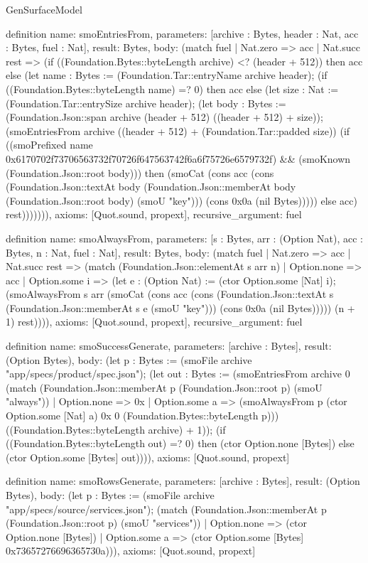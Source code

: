 \begin{lexlean}{GenSurfaceModel}
\begin{semanticmodule}
definition{
  name: smoEntriesFrom,
  parameters: [archive : Bytes, header : Nat, acc : Bytes, fuel : Nat],
  result: Bytes,
  body: (match fuel
    | Nat.zero => acc
    | Nat.succ rest => (if ((Foundation.Bytes::byteLength archive) <? (header + 512)) then acc else (let name : Bytes := (Foundation.Tar::entryName archive header); (if ((Foundation.Bytes::byteLength name) =? 0) then acc else (let size : Nat := (Foundation.Tar::entrySize archive header); (let body : Bytes := (Foundation.Json::span archive (header + 512) ((header + 512) + size)); (smoEntriesFrom archive ((header + 512) + (Foundation.Tar::padded size)) (if ((smoPrefixed name 0x6170702f73706563732f70726f647563742f6a6f75726e6579732f) && (smoKnown (Foundation.Json::root body))) then (smoCat (cons acc (cons (Foundation.Json::textAt body (Foundation.Json::memberAt body (Foundation.Json::root body) (smoU "key"))) (cons 0x0a (nil Bytes))))) else acc) rest))))))),
  axioms: [Quot.sound, propext],
  recursive_argument: fuel
}

definition{
  name: smoAlwaysFrom,
  parameters: [s : Bytes, arr : (Option Nat), acc : Bytes, n : Nat, fuel : Nat],
  result: Bytes,
  body: (match fuel
    | Nat.zero => acc
    | Nat.succ rest => (match (Foundation.Json::elementAt s arr n)
      | Option.none => acc
      | Option.some i => (let e : (Option Nat) := (ctor Option.some [Nat] i); (smoAlwaysFrom s arr (smoCat (cons acc (cons (Foundation.Json::textAt s (Foundation.Json::memberAt s e (smoU "key"))) (cons 0x0a (nil Bytes))))) (n + 1) rest)))),
  axioms: [Quot.sound, propext],
  recursive_argument: fuel
}

definition{
  name: smoSuccessGenerate,
  parameters: [archive : Bytes],
  result: (Option Bytes),
  body: (let p : Bytes := (smoFile archive "app/specs/product/spec.json"); (let out : Bytes := (smoEntriesFrom archive 0 (match (Foundation.Json::memberAt p (Foundation.Json::root p) (smoU "always"))
    | Option.none => 0x
    | Option.some a => (smoAlwaysFrom p (ctor Option.some [Nat] a) 0x 0 (Foundation.Bytes::byteLength p))) ((Foundation.Bytes::byteLength archive) + 1)); (if ((Foundation.Bytes::byteLength out) =? 0) then (ctor Option.none [Bytes]) else (ctor Option.some [Bytes] out)))),
  axioms: [Quot.sound, propext]
}

definition{
  name: smoRowsGenerate,
  parameters: [archive : Bytes],
  result: (Option Bytes),
  body: (let p : Bytes := (smoFile archive "app/specs/source/services.json"); (match (Foundation.Json::memberAt p (Foundation.Json::root p) (smoU "services"))
    | Option.none => (ctor Option.none [Bytes])
    | Option.some a => (ctor Option.some [Bytes] 0x73657276696365730a))),
  axioms: [Quot.sound, propext]
}
\end{semanticmodule}
\end{lexlean}
